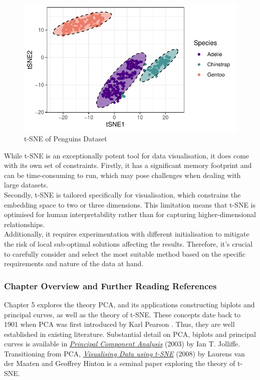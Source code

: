 \documentclass{article}\usepackage[]{graphicx}\usepackage[]{xcolor}
\makeatletter
\def\maxwidth{ %
  \ifdim\Gin@nat@width>\linewidth
    \linewidth
  \else
    \Gin@nat@width
  \fi
}
\newenvironment{knitrout}{}{} %
\numberwithin{equation}{section}
\makeatother
\begin{document}
\begin{knitrout}
\begin{figure}[H]
{\centering \includegraphics[width=\maxwidth]{figure/beamer-t-SNE-1} 

}

\caption[t-SNE of Penguins Dataset]{t-SNE of Penguins Dataset}\label{fig:t-SNE}
\end{figure}

\end{knitrout}

\noindent
While t-SNE is an exceptionally potent tool for data visualisation, it does come with its own set of constraints. Firstly, it has a significant memory footprint and can be time-consuming to run, which may pose challenges when dealing with large datasets.\\

\noindent
Secondly, t-SNE is tailored specifically for visualisation, which constrains the embedding space to two or three dimensions. This limitation means that t-SNE is optimised for human interpretability rather than for capturing higher-dimensional relationships.\\

\noindent
Additionally, it requires experimentation with different initialisation to mitigate the risk of local sub-optimal solutions affecting the results. Therefore, it's crucial to carefully consider and select the most suitable method based on the specific requirements and nature of the data at hand.

\subsubsection*{Chapter Overview and Further Reading References}

\noindent Chapter 5 explores the theory PCA, and its applications constructing biplots and principal curves, as well as the theory of t-SNE. These concepts date back to 1901 when PCA was first introduced by Karl Pearson \cite{pearson1901liii}. Thus, they are well established in existing literature. Substantial detail on PCA, biplots and principal curves is available in \href{https://link.springer.com/book/10.1007/b98835}{\textit{Principal Component Analysis}} (2003) by Ian T. Jolliffe. Transitioning from PCA, \href{https://www.jmlr.org/papers/volume9/vandermaaten08a/vandermaaten08a.pdf}{\textit{Visualising Data using t-SNE}} (2008) by  Laurens van der Maaten and Geoffrey Hinton is a seminal paper exploring the theory of t-SNE. 
\end{document}
